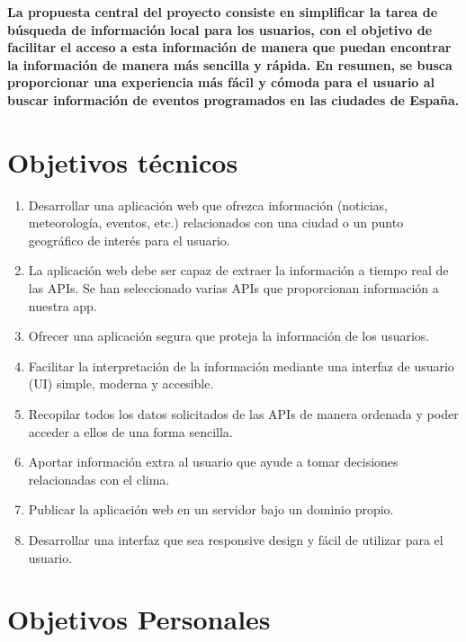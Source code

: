 
\textbf{La propuesta central del proyecto consiste en simplificar la tarea de búsqueda de información local para los usuarios, con el objetivo de facilitar el acceso a esta información de manera que puedan encontrar la información de manera más sencilla y rápida. En resumen, se busca proporcionar una experiencia más fácil y cómoda para el usuario al buscar información de eventos programados en las ciudades de España.}

\section{Objetivos técnicos}

\begin{enumerate}
    \item Desarrollar una aplicación web que ofrezca información (noticias, meteorología, eventos, etc.) relacionados con una ciudad o un punto geográfico de interés para el usuario.
    \item La aplicación web debe ser capaz de extraer la información a tiempo real de las APIs. Se han seleccionado varias APIs que proporcionan información a nuestra app.
    \item Ofrecer una aplicación segura que proteja la información de los usuarios.
    \item Facilitar la interpretación de la información mediante una interfaz de usuario (UI) simple, moderna y accesible.
    \item Recopilar todos los datos solicitados de las APIs de manera ordenada y poder acceder a ellos de una forma sencilla.
    \item Aportar información extra al usuario que ayude a tomar decisiones relacionadas con el clima.
    \item Publicar la aplicación web en un servidor bajo un dominio propio.
    \item Desarrollar una interfaz que sea responsive design y fácil de utilizar para el usuario.
    
\end{enumerate}



\section{Objetivos Personales}

